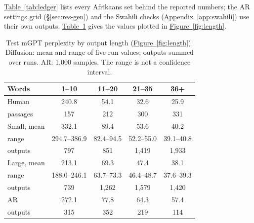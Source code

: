 \documentclass[11pt,a4paper]{article}
\begin{document}
\hyperref[tab:ledger]{Table~\ref*{tab:ledger}} lists every Afrikaans set behind the reported numbers; the AR settings grid (\S\ref{sec:res-gen}) and the Swahili checks (\hyperref[app:swahili]{Appendix~\ref*{app:swahili}}) use their own outputs. \hyperref[tab:bands]{Table~\ref*{tab:bands}} gives the values plotted in \hyperref[fig:length]{Figure~\ref*{fig:length}}.

\begin{table}[t]
\centering
\setlength{\tabcolsep}{12pt}
\begin{tabular}{@{}lcccc@{}}
\toprule
Words & 1--10 & 11--20 & 21--35 & 36+ \\
\midrule
Human & 240.8 & 54.1 & 32.6 & 25.9 \\
\quad passages & 157 & 212 & 300 & 331 \\
Small, mean & 332.1 & 89.4 & 53.6 & 40.2 \\
\quad range & 294.7--386.9 & 82.4--94.5 & 52.2--55.0 & 39.1--40.8 \\
\quad outputs & 797 & 851 & 1,419 & 1,933 \\
Large, mean & 213.1 & 69.3 & 47.4 & 38.1 \\
\quad range & 188.0--246.1 & 63.7--73.3 & 46.4--48.7 & 37.6--39.3 \\
\quad outputs & 739 & 1,262 & 1,579 & 1,420 \\
AR & 272.1 & 77.8 & 64.3 & 57.4 \\
\quad outputs & 315 & 352 & 219 & 114 \\
\bottomrule
\end{tabular}
\caption{Test mGPT perplexity by output length (\hyperref[fig:length]{Figure~\ref*{fig:length}}). Diffusion: mean and range of five run values; outputs summed over runs. AR: 1,000 samples. The range is not a confidence interval.}
\label{tab:bands}
\end{table}
\end{document}
